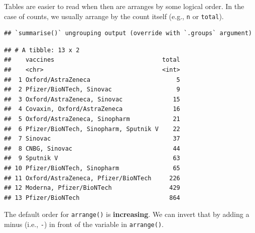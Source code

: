 \documentclass[
]{book}
\newenvironment{Shaded}{\begin{snugshade}}{\end{snugshade}}
\newcommand{\DataTypeTok}[1]{\textcolor[rgb]{0.13,0.29,0.53}{#1}}
\newcommand{\KeywordTok}[1]{\textcolor[rgb]{0.13,0.29,0.53}{\textbf{#1}}}
\newcommand{\NormalTok}[1]{#1}
\newcommand{\OperatorTok}[1]{\textcolor[rgb]{0.81,0.36,0.00}{\textbf{#1}}}
\newcommand{\StringTok}[1]{\textcolor[rgb]{0.31,0.60,0.02}{#1}}
\begin{document}
Tables are easier to read when then are arranges by some logical order. In the case of counts, we usually arrange by the count itself (e.g., \texttt{n} or \texttt{total}).

\begin{Shaded}
\end{Shaded}

\begin{verbatim}
## `summarise()` ungrouping output (override with `.groups` argument)
\end{verbatim}

\begin{verbatim}
## # A tibble: 13 x 2
##    vaccines                              total
##    <chr>                                 <int>
##  1 Oxford/AstraZeneca                        5
##  2 Pfizer/BioNTech, Sinovac                  9
##  3 Oxford/AstraZeneca, Sinovac              15
##  4 Covaxin, Oxford/AstraZeneca              16
##  5 Oxford/AstraZeneca, Sinopharm            21
##  6 Pfizer/BioNTech, Sinopharm, Sputnik V    22
##  7 Sinovac                                  37
##  8 CNBG, Sinovac                            44
##  9 Sputnik V                                63
## 10 Pfizer/BioNTech, Sinopharm               65
## 11 Oxford/AstraZeneca, Pfizer/BioNTech     226
## 12 Moderna, Pfizer/BioNTech                429
## 13 Pfizer/BioNTech                         864
\end{verbatim}

The default order for \texttt{arrange()} is \textbf{increasing}. We can invert that by adding a minus (i.e., \texttt{-}) in front of the variable in \texttt{arrange()}.

\begin{Shaded}
\end{Shaded}
\end{document}
